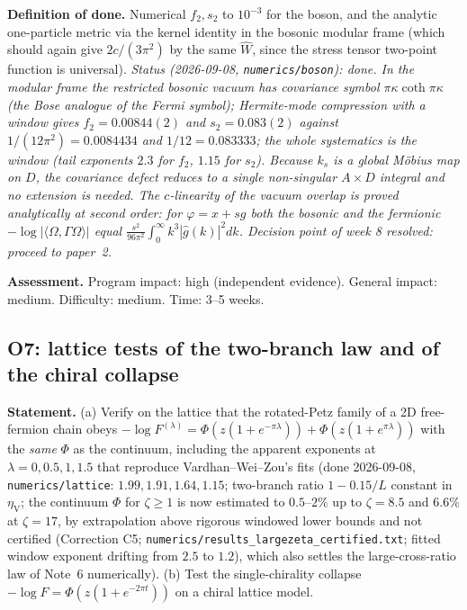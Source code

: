 \documentclass[11pt]{article}
\theoremstyle{accent}
\theoremstyle{definition}
\begin{document}
\textbf{Definition of done.} Numerical \(f_2,s_2\) to \(10^{-3}\) for the boson, and the analytic one-particle metric via the kernel identity in the bosonic modular frame (which should again give \(2c/(3\pi^2)\) by the same \(\widehat W\), since the stress tensor two-point function is universal).  \emph{Status (2026-09-08, \texttt{numerics/boson}): done.  In the modular frame the restricted bosonic vacuum has covariance symbol \(\pi\kappa\coth\pi\kappa\) (the Bose analogue of the Fermi symbol); Hermite-mode compression with a window gives \(f_2=0.00844(2)\) and \(s_2=0.083(2)\) against \(1/(12\pi^2)=0.0084434\) and \(1/12=0.083333\); the whole systematics is the window (tail exponents \(2.3\) for \(f_2\), \(1.15\) for \(s_2\)).  Because \(k_s\) is a global M\"obius map on \(D\), the covariance defect reduces to a single non-singular \(A\times D\) integral and no extension is needed.  The \(c\)-linearity of the vacuum overlap is proved analytically at second order: for \(\varphi=x+sg\) both the bosonic and the fermionic \(-\log|\langle\Omega,\Gamma\Omega\rangle|\) equal \(\frac{s^2}{96\pi^2}\int_0^\infty k^3|\hat g(k)|^2dk\).  Decision point of week 8 resolved: proceed to paper~2.}

\textbf{Assessment.} Program impact: high (independent evidence).  General impact: medium.  Difficulty: medium.  Time: 3--5 weeks.

\subsection{O7: lattice tests of the two-branch law and of the chiral collapse}\label{sec:O7}
\textbf{Statement.} (a) Verify on the lattice that the rotated-Petz family of a 2D free-fermion chain obeys \(-\log F^{(\lambda)}=\Phi(z(1+e^{-\pi\lambda}))+\Phi(z(1+e^{\pi\lambda}))\) with the \emph{same} \(\Phi\) as the continuum, including the apparent exponents at \(\lambda=0,0.5,1,1.5\) that reproduce Vardhan--Wei--Zou's fits (done 2026-09-08, \texttt{numerics/lattice}: \(1.99,1.91,1.64,1.15\); two-branch ratio \(1-0.15/L\) constant in \(\eta_{\mathrm V}\); the continuum \(\Phi\) for \(\zeta\ge1\) is now estimated to \(0.5\)--\(2\%\) up to \(\zeta=8.5\) and \(6.6\%\) at \(\zeta=17\), by extrapolation above rigorous windowed lower bounds and not certified (Correction C5; \texttt{numerics/results\_largezeta\_certified.txt}; fitted window exponent drifting from \(2.5\) to \(1.2\)), which also settles the large-cross-ratio law of Note~6 numerically).  (b) Test the single-chirality collapse \(-\log F=\Phi(z(1+e^{-2\pi t}))\) on a chiral lattice model.
\end{document}
